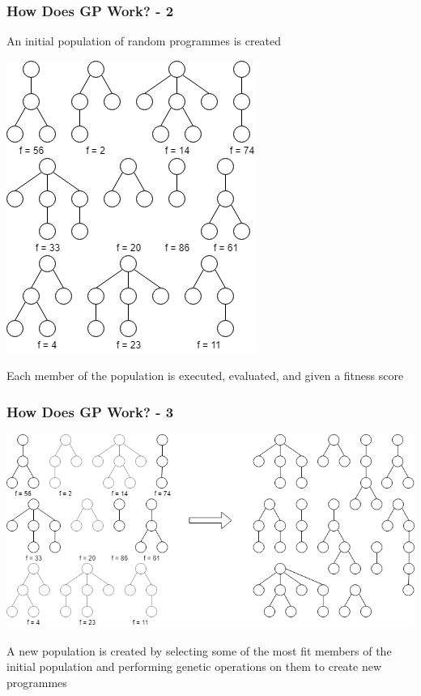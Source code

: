 \documentclass{beamer}
\begin{document}
		\begin{frame}
		
			\frametitle{How Does GP Work? - 2}
			
			\begin{center}
				
				An initial population of random programmes is created
				
				\includegraphics[scale=0.4]{resources/3_gp_example_fitness}
				
				Each member of the population is executed, evaluated, and given a fitness score
				
			\end{center}
			
		\end{frame}
	
		\begin{frame}
		
			\frametitle{How Does GP Work? - 3}
			
			\begin{center}
			
				\includegraphics[scale=0.4]{resources/4_gp_example_selection}
				
				A new population is created by selecting some of the most fit members of the initial population and performing genetic operations on them to create new programmes
				
			\end{center}
		
		\end{frame}
	
\end{document}
